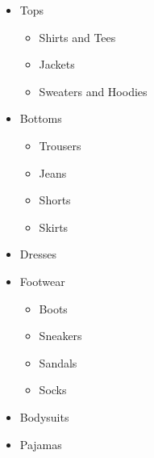 \begin{itemize}
	 \item Tops
	 	\begin{itemize}
		 \item Shirts and Tees
      	 \item Jackets
      	 \item Sweaters and Hoodies
		\end{itemize}
     \item Bottoms
	 	\begin{itemize}
		 \item Trousers
		 \item Jeans
		 \item Shorts
		 \item Skirts
		\end{itemize}
	 \item Dresses
	 \item Footwear
	 	\begin{itemize}
		 \item Boots
		 \item Sneakers
		 \item Sandals
		 \item Socks
		\end{itemize}
	 \item Bodysuits	
     \item Pajamas
	\end{itemize}

